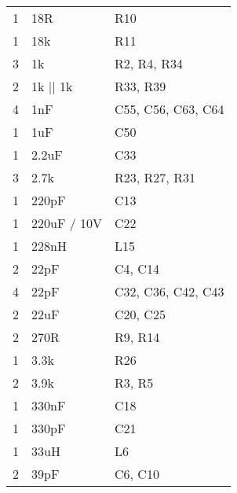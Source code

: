 \begin{longtable}{l|l|l}
	1   & 18R           & R10                                                          \\
	1   & 18k           & R11                                                          \\
	3   & 1k            & R2, R4, R34                                                  \\
	2   & 1k || 1k      & R33, R39                                                     \\
	4   & 1nF           & C55, C56, C63, C64                                           \\
	1   & 1uF           & C50                                                          \\
	1   & 2.2uF         & C33                                                          \\
	3   & 2.7k          & R23, R27, R31                                                \\
	1   & 220pF         & C13                                                          \\
	1   & 220uF / 10V   & C22                                                          \\
	1   & 228nH         & L15                                                          \\
	2   & 22pF          & C4, C14                                                      \\
	4   & 22pF          & C32, C36, C42, C43                                           \\
	2   & 22uF          & C20, C25                                                     \\
	2   & 270R          & R9, R14                                                      \\
	1   & 3.3k          & R26                                                          \\
	2   & 3.9k          & R3, R5                                                       \\
	1   & 330nF         & C18                                                          \\
	1   & 330pF         & C21                                                          \\
	1   & 33uH          & L6                                                           \\
	2   & 39pF          & C6, C10                                                      \\

\end{longtable}
